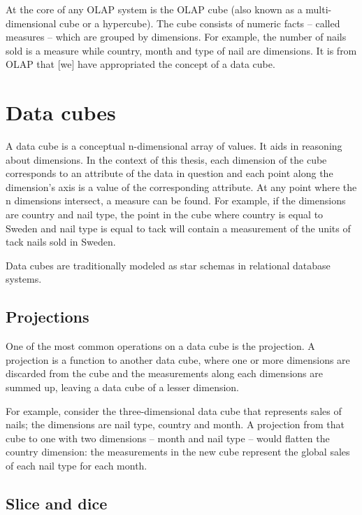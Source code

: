 At the core of any OLAP system is the OLAP cube (also known as a
multi-dimensional cube or a hypercube). The cube consists of numeric facts
-- called measures -- which are grouped by dimensions. For example, the number
of nails sold is a measure while country, month and type of nail are
dimensions. It is from OLAP that [we] have appropriated the concept of a data
cube.


\section{Data cubes}

A data cube is a conceptual n-dimensional array of values. It aids in
reasoning about dimensions. In the context of this thesis, each dimension of
the cube corresponds to an attribute of the data in question and each point
along the dimension's axis is a value of the corresponding attribute. At any
point where the n dimensions intersect, a measure can be found. For example,
if the dimensions are country and nail type, the point in the cube where
country is equal to Sweden and nail type is equal to tack will contain a
measurement of the units of tack nails sold in Sweden.

Data cubes are traditionally modeled as star schemas in relational database
systems. \cite{olap_solutions}


\subsection*{Projections}

One of the most common operations on a data cube is the projection. A
projection is a function to another data cube, where one or more dimensions
are discarded from the cube and the measurements along each dimensions are
summed up, leaving a data cube of a lesser dimension.

For example, consider the three-dimensional data cube that represents sales of
nails; the dimensions are nail type, country and month. A projection from that
cube to one with two dimensions -- month and nail type -- would flatten the
country dimension: the measurements in the new cube represent the global sales
of each nail type for each month.


\subsection*{Slice and dice}

